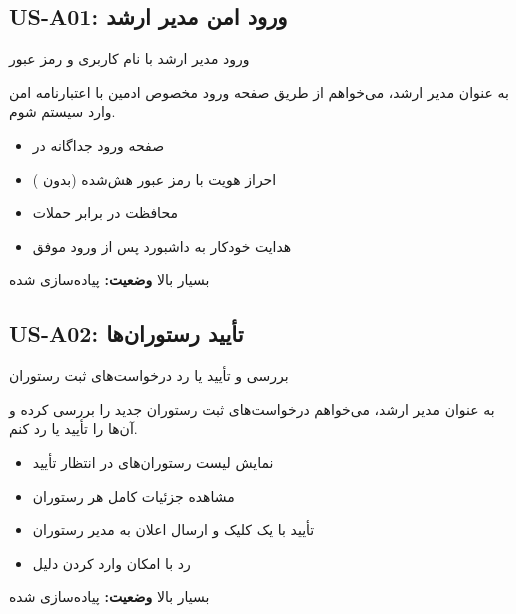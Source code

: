\documentclass[12pt, a4paper]{article}
\begin{document}
\subsection{US-A01: ورود امن مدیر ارشد}
\begin{description}[rightmargin=0.5cm]
  \item[عنوان:] ورود مدیر ارشد با نام کاربری و رمز عبور
  \item[داستان:] به عنوان مدیر ارشد، می‌خواهم از طریق صفحه ورود مخصوص ادمین با اعتبارنامه
  امن وارد سیستم شوم.
  \item[معیارهای پذیرش:]
  \begin{itemize}[rightmargin=0.5cm]
    \item صفحه ورود جداگانه در 
    \item احراز هویت با رمز عبور هش‌شده (بدون )
    \item محافظت در برابر حملات 
    \item هدایت خودکار به داشبورد پس از ورود موفق
  \end{itemize}
  \item[اولویت:] بسیار بالا \quad \textbf{وضعیت:} پیاده‌سازی شده
\end{description}

\subsection{US-A02: تأیید رستوران‌ها}
\begin{description}[rightmargin=0.5cm]
  \item[عنوان:] بررسی و تأیید یا رد درخواست‌های ثبت رستوران
  \item[داستان:] به عنوان مدیر ارشد، می‌خواهم درخواست‌های ثبت رستوران جدید را بررسی
  کرده و آن‌ها را تأیید یا رد کنم.
  \item[معیارهای پذیرش:]
  \begin{itemize}[rightmargin=0.5cm]
    \item نمایش لیست رستوران‌های در انتظار تأیید
    \item مشاهده جزئیات کامل هر رستوران
    \item تأیید با یک کلیک و ارسال اعلان به مدیر رستوران
    \item رد با امکان وارد کردن دلیل
  \end{itemize}
  \item[اولویت:] بسیار بالا \quad \textbf{وضعیت:} پیاده‌سازی شده
\end{description}
\end{document}
